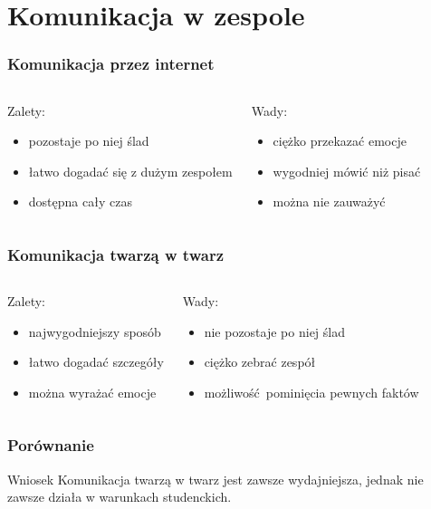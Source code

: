 \section{Komunikacja w zespole}
\label{komunikacja}


\begin{frame}
    \frametitle{Komunikacja przez internet}
    \begin{columns}[t]
        \begin{block}{Zalety:}
            \begin{itemize}
                \item pozostaje po niej ślad
                \item łatwo dogadać się z dużym zespołem
                \item dostępna cały czas
            \end{itemize}
        \end{block}
        \begin{block}{Wady:}
            \begin{itemize}
                \item ciężko przekazać emocje
                \item wygodniej mówić niż pisać
                \item można nie zauważyć 
            \end{itemize}
        \end{block}
    \end{columns}
\end{frame}

\begin{frame}
    \frametitle{Komunikacja twarzą w twarz}
    \begin{columns}[t]
        \begin{block}{Zalety:}
            \begin{itemize}
                \item najwygodniejszy sposób
                \item łatwo dogadać szczegóły
                \item można wyrażać emocje
            \end{itemize}
        \end{block}
        \begin{block}{Wady:}
            \begin{itemize}
                \item nie pozostaje po niej ślad
                \item ciężko zebrać zespół
                \item możliwość pominięcia pewnych faktów
            \end{itemize}
        \end{block}
    \end{columns}
\end{frame}

\begin{frame}
    \frametitle{Porównanie}
    \begin{block}{Wniosek}
        Komunikacja twarzą w twarz jest zawsze wydajniejsza, jednak nie zawsze działa
        w warunkach studenckich.
    \end{block}
\end{frame}
